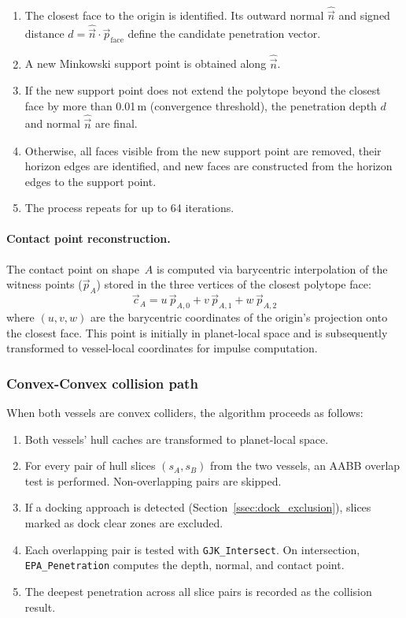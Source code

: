 \documentclass[Orbiter Technical Reference.tex]{subfiles}
\begin{document}
\begin{enumerate}
\item The closest face to the origin is identified.  Its outward
  normal $\hat{\vec{n}}$ and signed distance
  $d = \hat{\vec{n}} \cdot \vec{p}_{\mathrm{face}}$ define the
  candidate penetration vector.
\item A new Minkowski support point is obtained along $\hat{\vec{n}}$.
\item If the new support point does not extend the polytope beyond
  the closest face by more than 0.01\,m (convergence threshold), the
  penetration depth $d$ and normal $\hat{\vec{n}}$ are final.
\item Otherwise, all faces visible from the new support point are
  removed, their horizon edges are identified, and new faces are
  constructed from the horizon edges to the support point.
\item The process repeats for up to 64 iterations.
\end{enumerate}

\paragraph{Contact point reconstruction.}
The contact point on shape~$A$ is computed via barycentric interpolation
of the witness points ($\vec{p}_A$) stored in the three vertices of the
closest polytope face:
\begin{equation*}
\vec{c}_A = u\,\vec{p}_{A,0} + v\,\vec{p}_{A,1} + w\,\vec{p}_{A,2}
\end{equation*}
where $(u, v, w)$ are the barycentric coordinates of the origin's
projection onto the closest face.  This point is initially in
planet-local space and is subsequently transformed to vessel-local
coordinates for impulse computation.


\subsubsection{Convex-Convex collision path}
When both vessels are convex colliders, the algorithm proceeds as follows:

\begin{enumerate}
\item Both vessels' hull caches are transformed to planet-local space.
\item For every pair of hull slices $(s_A, s_B)$ from the two vessels,
  an AABB overlap test is performed.  Non-overlapping pairs are skipped.
\item If a docking approach is detected
  (Section~\ref{ssec:dock_exclusion}), slices marked as dock clear
  zones are excluded.
\item Each overlapping pair is tested with \texttt{GJK\_Intersect}.
  On intersection, \texttt{EPA\_Penetration} computes the depth, normal,
  and contact point.
\item The deepest penetration across all slice pairs is recorded as the
  collision result.
\end{enumerate}
\end{document}
